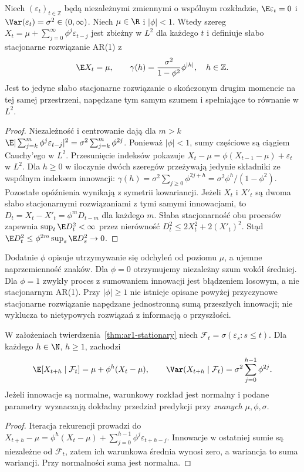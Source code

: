 \begin{twierdzenie}
\label{thm:ar1-stationary}
Niech $(\varepsilon_t)_{t\in\mathbb Z}$ będą
niezależnymi zmiennymi o wspólnym rozkładzie,
$\E\varepsilon_t=0$ i
$\Var(\varepsilon_t)=\sigma^2\in(0,\infty)$.
Niech $\mu\in\R$ i $|\phi|<1$. Wtedy szereg
$X_t=\mu+\sum_{j=0}^{\infty}\phi^j\varepsilon_{t-j}$
jest zbieżny w $L^2$ dla każdego $t$ i definiuje
słabo stacjonarne rozwiązanie AR(1) z
\[
 \E X_t=\mu,\qquad
 \gamma(h)=\frac{\sigma^2}{1-\phi^2}\phi^{|h|},
 \quad h\in\mathbb Z.
\]
Jest to jedyne słabo stacjonarne rozwiązanie o skończonym
drugim momencie na tej samej przestrzeni, napędzane tym samym
szumem i spełniające to równanie w $L^2$.
\end{twierdzenie}
\begin{proof}
Niezależność i centrowanie dają dla $m>k$
$\E|\sum_{j=k}^m\phi^j\varepsilon_{t-j}|^2
=\sigma^2\sum_{j=k}^m\phi^{2j}$.
Ponieważ $|\phi|<1$, sumy częściowe są ciągiem
Cauchy'ego w $L^2$. Przesunięcie indeksów pokazuje
$X_t-\mu=\phi(X_{t-1}-\mu)+\varepsilon_t$ w $L^2$.
Dla $h\ge0$ w iloczynie dwóch szeregów przeżywają
jedynie składniki ze wspólnym indeksem innowacji:
$\gamma(h)=\sigma^2\sum_{j\ge0}\phi^{2j+h}
=\sigma^2\phi^h/(1-\phi^2)$. Pozostałe opóźnienia
wynikają z symetrii kowariancji.
Jeżeli $X_t$ i $X'_t$ są dwoma słabo stacjonarnymi
rozwiązaniami z tymi samymi innowacjami, to
$D_t=X_t-X'_t=\phi^mD_{t-m}$ dla każdego $m$.
Słaba stacjonarność obu procesów zapewnia
$\sup_t\E D_t^2<\infty$ przez nierówność
$D_t^2\le2X_t^2+2(X'_t)^2$.
Stąd $\E D_t^2\le\phi^{2m}\sup_s\E D_s^2\to0$.
\end{proof}

\begin{uwaga}
Dodatnie $\phi$ opisuje utrzymywanie się odchyleń
od poziomu $\mu$, a ujemne naprzemienność znaków.
Dla $\phi=0$ otrzymujemy niezależny szum wokół średniej.
Dla $\phi=1$ zwykły proces z sumowaniem innowacji
jest błądzeniem losowym, a nie stacjonarnym AR(1).
Przy $|\phi|\ge1$ nie istnieje opisane powyżej
przyczynowe stacjonarne rozwiązanie napędzane
jednostronną sumą przeszłych innowacji; nie wyklucza
to nietypowych rozwiązań z informacją o przyszłości.
\end{uwaga}

\begin{twierdzenie}
\label{thm:ar1-forecast}
W założeniach twierdzenia~\ref{thm:ar1-stationary}
niech $\mathcal F_t=\sigma(\varepsilon_s:s\le t)$.
Dla każdego $h\in\N$, $h\ge1$, zachodzi
\[
 \E[X_{t+h}\mid\mathcal F_t]
 =\mu+\phi^h(X_t-\mu),\qquad
 \Var(X_{t+h}\mid\mathcal F_t)
 =\sigma^2\sum_{j=0}^{h-1}\phi^{2j}.
\]
Jeżeli innowacje są normalne, warunkowy rozkład jest
normalny i podane parametry wyznaczają dokładny
przedział predykcji przy \emph{znanych} $\mu,\phi,\sigma$.
\end{twierdzenie}
\begin{proof}
Iteracja rekurencji prowadzi do
$X_{t+h}-\mu=\phi^h(X_t-\mu)+
\sum_{j=0}^{h-1}\phi^j\varepsilon_{t+h-j}$.
Innowacje w ostatniej sumie są niezależne od
$\mathcal F_t$, zatem ich warunkowa średnia
wynosi zero, a wariancja to suma wariancji.
Przy normalności suma jest normalna.
\end{proof}

